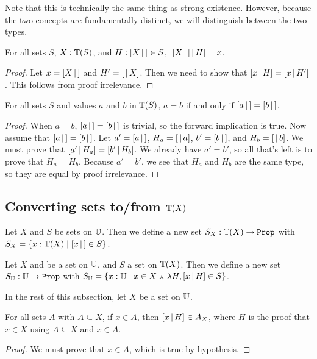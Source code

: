 \documentclass[../math.tex]{subfiles}
\begin{document}
Note that this is technically the same thing as strong existence.  However,
because the two concepts are fundamentally distinct, we will distinguish between
the two types.

\begin{theorem} \label{set-type-simpl}
    For all sets $S$, $X : \mathbb{T}(S)$, and $H : [ X\, |\,] \in S$, $[ [ X\, |\,] \, | \, H ] =
    x$.
\end{theorem}
\begin{proof}
    Let $x = [ X\, |\,]$ and $H' = [ \,|\, X ]$.  Then we need to show that $[ x \, | \, H ]
    = [ x \, | \, H' ]$.  This follows from proof irrelevance.
\end{proof}

\begin{theorem} \label{set-type-eq}
    For all sets $S$ and values $a$ and $b$ in $\mathbb{T}(S)$, $a = b$ if and only if
    $[ a\, |\,] = [ b\, |\,]$.
\end{theorem}
\begin{proof}
    When $a = b$, $[ a\, |\,] = [ b\, |\,]$ is trivial, so the forward implication is
    true.  Now assume that $[ a\, |\,] = [ b\, |\,]$.  Let $a' = [ a\, |\,]$, $H_a = [ \,|\, a ]$, $b' = [ b\, |\,]$, and $H_b = [ \,|\, b ]$.  We must prove that $[ a' \, | \, H_a ] =
    [ b' \, | \, H_b ]$.  We already have $a' = b'$, so all that's left is to prove
    that $H_a = H_b$.  Because $a' = b'$, we see that $H_a$ and $H_b$ are the
    same type, so they are equal by proof irrelevance.
\end{proof}

\subsection{Converting sets to/from $\mathbb{T}(X)$}

\begin{definition}
    Let $X$ and $S$ be sets on $\mathbb{U}$.  Then we define a new set $S_X : \T(X)
    \rightarrow \Prop$ with $S_X = \{x : \mathbb{T}(X) \mid [ x\, |\,] \in S\}$.
\end{definition}

\begin{definition}
    Let $X$ and be a set on $\mathbb{U}$, and $S$ a set on $\mathbb{T}(X)$.  Then we define a
    new set $S_\U : \U \rightarrow \Prop$ with $S_{\mathbb{U}} = \{x : \mathbb{U} \mid x \in X
    \curlywedge \lambda H, [ x \, | \, H ] \in S\}$.
\end{definition}

In the rest of this subsection, let $X$ be a set on $\mathbb{U}$.

\begin{theorem} \label{to-set-type-in}
    For all sets $A$ with $A \subseteq X$, if $x \in A$, then $[ x \, | \, H ] \in
    A_X$, where $H$ is the proof that $x \in X$ using $A \subseteq X$ and $x \in
    A$.
\end{theorem}
\begin{proof}
    We must prove that $x \in A$, which is true by hypothesis.
\end{proof}
\end{document}
